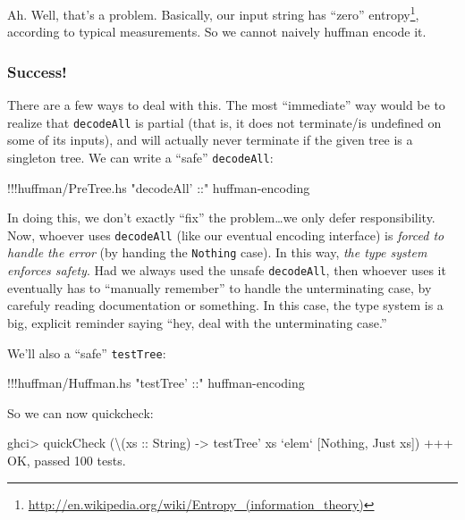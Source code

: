\documentclass[]{article}
\newenvironment{Shaded}{}{}
\newcommand{\DataTypeTok}[1]{\textcolor[rgb]{0.56,0.13,0.00}{{#1}}}
\newcommand{\DecValTok}[1]{\textcolor[rgb]{0.25,0.63,0.44}{{#1}}}
\newcommand{\StringTok}[1]{\textcolor[rgb]{0.25,0.44,0.63}{{#1}}}
\newcommand{\OtherTok}[1]{\textcolor[rgb]{0.00,0.44,0.13}{{#1}}}
\newcommand{\FunctionTok}[1]{\textcolor[rgb]{0.02,0.16,0.49}{{#1}}}
\newcommand{\NormalTok}[1]{{#1}}
\renewcommand{\href}[2]{#2\footnote{\url{#1}}}
\begin{document}
Ah. Well, that's a problem. Basically, our input string has
\href{http://en.wikipedia.org/wiki/Entropy_(information_theory)}{``zero''
entropy}, according to typical measurements. So we cannot naively
huffman encode it.

\subsubsection{Success!}\label{success}

There are a few ways to deal with this. The most ``immediate'' way would
be to realize that \texttt{decodeAll} is partial (that is, it does not
terminate/is undefined on some of its inputs), and will actually never
terminate if the given tree is a singleton tree. We can write a ``safe''
\texttt{decodeAll}:

\begin{Shaded}
\begin{Highlighting}[]
\FunctionTok{!!!}\NormalTok{huffman}\FunctionTok{/}\NormalTok{PreTree.hs }\StringTok{"decodeAll' ::"} \NormalTok{huffman}\FunctionTok{-}\NormalTok{encoding}
\end{Highlighting}
\end{Shaded}

In doing this, we don't exactly ``fix'' the problem\ldots{}we only defer
responsibility. Now, whoever uses \texttt{decodeAll\textquotesingle{}}
(like our eventual encoding interface) is \emph{forced to handle the
error} (by handing the \texttt{Nothing} case). In this way, \emph{the
type system enforces safety}. Had we always used the unsafe
\texttt{decodeAll}, then whoever uses it eventually has to ``manually
remember'' to handle the unterminating case, by carefuly reading
documentation or something. In this case, the type system is a big,
explicit reminder saying ``hey, deal with the unterminating case.''

We'll also a ``safe'' \texttt{testTree}:

\begin{Shaded}
\begin{Highlighting}[]
\FunctionTok{!!!}\NormalTok{huffman}\FunctionTok{/}\NormalTok{Huffman.hs }\StringTok{"testTree' ::"} \NormalTok{huffman}\FunctionTok{-}\NormalTok{encoding}
\end{Highlighting}
\end{Shaded}

So we can now quickcheck:

\begin{Shaded}
\begin{Highlighting}[]
\NormalTok{ghci}\FunctionTok{>} \NormalTok{quickCheck (\textbackslash{}(}\OtherTok{xs ::} \DataTypeTok{String}\NormalTok{) }\OtherTok{->} \NormalTok{testTree' xs }\OtherTok{`elem`} \NormalTok{[}\DataTypeTok{Nothing}\NormalTok{, }\DataTypeTok{Just} \NormalTok{xs])}
\FunctionTok{+++} \DataTypeTok{OK}\NormalTok{, passed }\DecValTok{100} \NormalTok{tests}\FunctionTok{.}
\end{Highlighting}
\end{Shaded}
\end{document}
